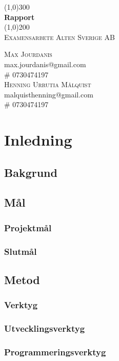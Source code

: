 \documentclass{article}
\begin{document}
\begin{titlepage}
    \begin{center}
        \line(1,0){300}\\
        \huge{\bfseries Rapport  }\\
        \line(1,0){200}\\
        [1cm]
        \textsc{\LARGE Examensarbete Alten Sverige AB }\\
        [13cm]
    \end{center}
    \begin{flushright}
        \textsc{\Large Max Jourdanis \\}
        max.jourdanis@gmail.com\\
        \# 0730474197\\
        [4pt]
        \textsc{\Large Henning Urrutia Målquist \\}
        malquisthenning@gmail.com\\
        \# 0730474197
        
    \end{flushright}
    \end{titlepage}
\tableofcontents 

    \newpage
    
    \thispagestyle{empty}

    \cleardoublepage

    \setcounter{page}{1}
    
\section{Inledning}
    \subsection{Bakgrund}
    \subsection{Mål}
        \subsubsection{Projektmål}
        \subsubsection{Slutmål}
    \subsection{Metod}
        \subsubsection{Verktyg}
            \subsubsection{Utvecklingsverktyg}
            \subsubsection{Programmeringsverktyg}
\end{document}
